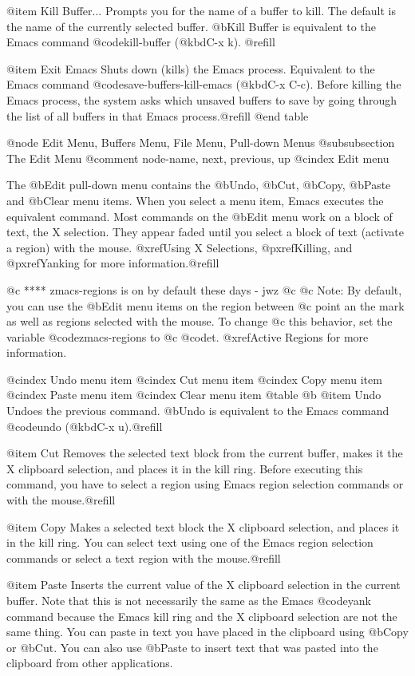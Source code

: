 {{@item Kill Buffer...
Prompts you for the name of a buffer to kill. The default is the name of
the currently selected buffer. @b{Kill Buffer} is equivalent to the
Emacs command @code{kill-buffer} (@kbd{C-x k}). @refill

@item Exit Emacs
Shuts down (kills) the Emacs process.  Equivalent to the Emacs command
@code{save-buffers-kill-emacs} (@kbd{C-x C-c}).  Before killing the
Emacs process, the system asks which unsaved buffers to save by going through
the list of all buffers in that Emacs process.@refill
@end table

@node Edit Menu, Buffers Menu, File Menu, Pull-down Menus
@subsubsection The Edit Menu
@comment  node-name,  next,  previous,  up
@cindex Edit menu

The @b{Edit} pull-down menu contains the @b{Undo}, @b{Cut}, @b{Copy},
@b{Paste} and @b{Clear} menu items.  When you select a menu item, Emacs
executes the equivalent command.  Most commands on the @b{Edit} menu
work on a block of text, the X selection.  They appear faded until you
select a block of text (activate a region) with the mouse.  @xref{Using
X Selections}, @pxref{Killing}, and @pxref{Yanking} for more
information.@refill

@c  **** zmacs-regions is on by default these days - jwz
@c
@c Note: By default, you can use the @b{Edit} menu items on the region between
@c point an the mark as well as regions selected with the mouse. To change
@c this behavior, set the variable @code{zmacs-regions} to
@c @code{t}. @xref{Active Regions} for more information.

@cindex Undo menu item
@cindex Cut menu item
@cindex Copy menu item
@cindex Paste menu item
@cindex Clear menu item
@table @b
@item Undo 
Undoes the previous command.  @b{Undo} is equivalent to
the Emacs command @code{undo} (@kbd{C-x u}).@refill

@item Cut
Removes the selected text block from the current buffer, makes it the X
clipboard selection, and places it in the kill ring.  Before executing
this command, you have to select a region using Emacs region selection
commands or with the mouse.@refill 

@item Copy 
Makes a selected text block the X clipboard selection, and places it in
the kill ring.  You can select text using one of the Emacs region
selection commands or select a text region with the mouse.@refill

@item Paste 
Inserts the current value of the X clipboard selection in the current
buffer.  Note that this is not necessarily the same as the Emacs
@code{yank} command because the Emacs kill ring and the X clipboard
selection are not the same thing.  You can paste in text you
have placed in the clipboard using @b{Copy} or @b{Cut}.  You can also
use @b{Paste} to insert text that was pasted into the clipboard from other
applications.

}}
